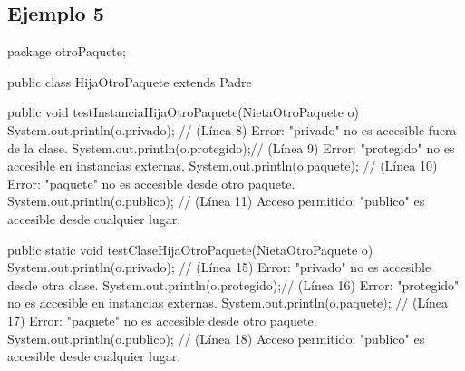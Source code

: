 \documentclass[a4paper,12pt]{article}
\begin{document}
\subsection{Ejemplo 5}

package otroPaquete;

public class HijaOtroPaquete extends Padre {

    public void testInstanciaHijaOtroPaquete(NietaOtroPaquete o) {
        System.out.println(o.privado);   // (Línea 8) Error: "privado" no es accesible fuera de la clase.
        System.out.println(o.protegido);// (Línea 9) Error: "protegido" no es accesible en instancias externas.
        System.out.println(o.paquete);  // (Línea 10) Error: "paquete" no es accesible desde otro paquete.
        System.out.println(o.publico);  // (Línea 11) Acceso permitido: "publico" es accesible desde cualquier lugar.
    }

    public static void testClaseHijaOtroPaquete(NietaOtroPaquete o) {
        System.out.println(o.privado);   // (Línea 15) Error: "privado" no es accesible desde otra clase.
        System.out.println(o.protegido);// (Línea 16) Error: "protegido" no es accesible en instancias externas.
        System.out.println(o.paquete);  // (Línea 17) Error: "paquete" no es accesible desde otro paquete.
        System.out.println(o.publico);  // (Línea 18) Acceso permitido: "publico" es accesible desde cualquier lugar.
    }
}

    




























    
    
\end{document}
